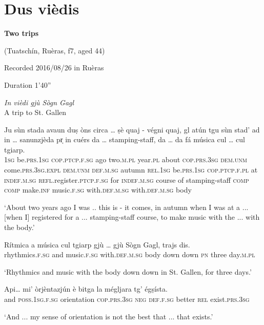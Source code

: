 \section{Dus vièdis}

\noindent
\textbf{Two trips}

\noindent
(Tuatschín, Ruèras, f7, aged 44)

\noindent
Recorded 2016/08/26 in Ruèras

\noindent
Duration 1'40''

\bigskip

\textit{In vièdi gjù Sògn Gagl}\\
A trip to St. Gallen\\
\smallskip


\begin{linenumbers}
	\gll Ju sùn stada avaun duṣ òns circa … ṣè quaj - végni quaj, gl atún tgu sùn stad' ad in …  sanunzjèda pr̩ in cuérs da … stamping-staff, da … da fá música cul … cul tgiarp.\\
	\textsc{1sg} be.\textsc{prs.1sg} \textsc{cop.ptcp.f.sg} ago two.\textsc{m.pl} year.\textsc{pl} about {} \textsc{cop.prs.3sg} \textsc{dem.unm} {} come.\textsc{prs.3sg.expl} \textsc{dem.unm} \textsc{def.m.sg} autumn \textsc{rel.1sg} be.\textsc{prs.1sg} \textsc{cop.ptcp.f.pl} at \textsc{indef.m.sg} {} \textsc{refl}.register.\textsc{ptcp.f.sg} for \textsc{indef.m.sg} course of {} stamping-staff \textsc{comp} {} \textsc{comp} make.\textsc{inf} music.\textsc{f.sg} with.\textsc{def.m.sg} {} with.\textsc{def.m.sg} body  \\
\end{linenumbers}
\medskip
\glt `About two years ago I was .. this is - it comes, in autumn when I was at a ... [when I] registered for a ... stamping-staff course, to make music with the ... with the body.'
\medskip

\begin{linenumbers}
	\gll  Rítmica a música cul tgiarp gjù … gjù Sògn Gagl, trajs dis.  \\
	rhythmics.\textsc{f.sg} and music.\textsc{f.sg} with.\textsc{def.m.sg} body down down \textsc{pn} {} three day.\textsc{m.pl}\\
\end{linenumbers}
\medskip
\glt `Rhythmics and music with the body down {} down in St. Gallen, for three days.'
\medskip

\begin{linenumbers}
	\gll Api… mi’ òrjèntazjún è bitga la mégljara tg’ égṣísta.   \\
	and \textsc{poss.1sg.f.sg} orientation \textsc{cop.prs.3sg} \textsc{neg} \textsc{def.f.sg} better \textsc{rel} exist.\textsc{prs.3sg}\\
\end{linenumbers}
\medskip
\glt `And ... my sense of orientation is not the best that ... that exists.'
\medskip


